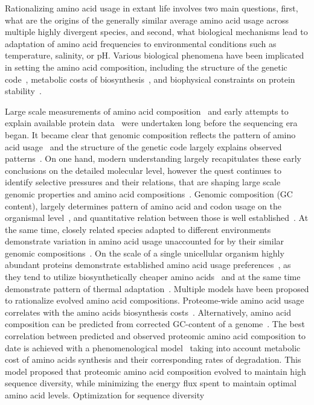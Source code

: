 \documentclass[10pt,letterpaper]{article}
\begin{document}
Rationalizing amino acid usage in extant life involves two main questions, first, what are the origins of the generally similar average amino acid usage across multiple highly divergent species, and second, what biological mechanisms lead to adaptation of amino acid frequencies to environmental conditions such as temperature, salinity, or pH. Various biological phenomena have been implicated in setting the amino acid composition, including the structure of the genetic code~\cite{Jukes1975Amino,Knight2001Simple,Lightfield2011Across,Goncearenco2014Fundamental,King1969NonDarwinian}, metabolic costs of biosynthesis~\cite{Akashi2002Metabolic,Krick2014Amino,Seligmann2003CostMinimization,Swire2007Selection,Heizer2011Amino}, and biophysical constraints on protein stability~\cite{Berezovsky2007Positive}.


Large scale measurements of amino acid composition~\cite{Sueoka1961Correlation} and early attempts to explain available protein data~\cite{Jukes1975Amino,King1969NonDarwinian} were undertaken long before the sequencing era began. It became clear that genomic composition reflects the pattern of amino acid usage~\cite{Sueoka1961Correlation} and the structure of the genetic code largely explains observed patterns~\cite{Jukes1975Amino,King1969NonDarwinian}. On one hand, modern understanding largely recapitulates these early conclusions on the detailed molecular level, however the quest continues to identify selective pressures and their relations, that are shaping large scale genomic properties and amino acid compositions~\cite{Rocha2010Mutational}. Genomic composition (GC content), largely determines pattern of amino acid and codon usage on the organismal level~\cite{Kreil2001Identification,Knight2001Simple,Lightfield2011Across}, and quantitative relation between those is well established~\cite{Goncearenco2014Fundamental}. At the same time, closely related species adapted to different environments demonstrate variation in amino acid usage unaccounted for by their similar genomic compositions~\cite{Singer2003Thermophilic,Haney1999Thermal,Fukuchi2003Unique}. On the scale of a single unicellular organism highly abundant proteins demonstrate established amino acid usage preferences~\cite{Akashi2002Metabolic}, as they tend to utilize biosynthetically cheaper amino acids~\cite{Akashi2002Metabolic,Heizer2006Amino} and at the same time demonstrate pattern of thermal adaptation~\cite{Cherry2010Highly}. Multiple models have been proposed to rationalize evolved amino acid compositions. Proteome-wide amino acid usage correlates with the amino acids biosynthesis costs~\cite{Seligmann2003CostMinimization,Heizer2011Amino,Krick2014Amino}. Alternatively, amino acid composition can be predicted from corrected GC-content of a genome~\cite{Goncearenco2014Fundamental}. The best correlation between predicted and observed proteomic amino acid composition to date is achieved with a phenomenological model~\cite{Krick2014Amino} taking into account metabolic cost of amino acids synthesis and their corresponding rates of degradation. This model proposed that proteomic amino acid composition evolved to maintain high sequence diversity, while minimizing the energy flux spent to maintain optimal amino acid levels. Optimization for sequence diversity 
\end{document}
